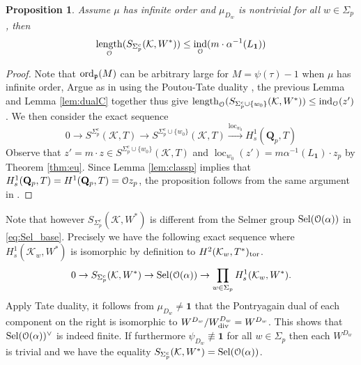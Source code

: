 \documentclass[leqno]{amsart}
\newtheorem{prop}[thm]{Proposition}
\theoremstyle{definition}
\theoremstyle{remark}
\newcommand{\id}{\mathbf{1}}
\newcommand{\eo}{\EuScript{O}}
\newcommand{\Qp}{\mathbf{Q}_p}
\DeclareMathOperator{\ind}{ind} %
\DeclareMathOperator{\length}{length}
\newcommand{\fp}{\mathfrak{p}}
\newcommand{\K}{{\mathcal{K}}} %
\newcommand{\ord}{\textnormal{ord}} %
\DeclareMathOperator{\loc}{loc}
\DeclareMathOperator{\Sel}{Sel}
\begin{document}
\begin{prop}
    Assume $\mu$ has infinite order and 
    $\mu_{D_w}$ is nontrivial for all $w\in\Sigma_p$, then
    \[
    \length_\eo(S_{\Sigma_p^c}(\K,W^*))\leq \ind_{\eo}(m\cdot \alpha^{-1}(L_\id))
    \]
\end{prop}
\begin{proof}
    Note that $\ord_\fp(M)$ can be arbitrary large for $M=\psi(\tau)-1$
    when $\mu$ has infinite order,
    Argue as in \cite[p.114]{Rubin}
    using the Poutou-Tate duality \cite[Thm 1.7.3]{Rubin},
    the previous Lemma and Lemma \ref{lem:dualC} together thus give
    $\length_\eo(S_{\Sigma_p^c\cup \{w_0\}}(\K,W^*))\leq \ind_{\eo}(z')$.
    We then consider the exact sequence
    \[
    0\to S^{\Sigma_p^c}(\K, T)\to 
    S^{\Sigma_p^c\cup\{w_0\}}(\K, T)\xrightarrow{\loc_{w_0}}  
    H^1_s(\Qp,T)
    \]
    Observe that $z'=m\cdot z\in S^{\Sigma_p^c\cup\{w_0\}}(\K,T)$
    and $\loc_{w_0}(z')=m\alpha^{-1}(L_\id)\cdot z_p$
    by Theorem \ref{thm:eu}.
    Since Lemma \ref{lem:classp} implies that
    $H^1_s(\Qp,T)=H^1(\Qp,T)=\eo z_p$,
    the proposition follows from the same argument in \cite[Thm 2.2.10]{Rubin}.
\end{proof}

Note that however $S_{\Sigma_p^c}(\K,W^*)$ is different
from the Selmer group $\Sel(\eo(\alpha))$ in \eqref{eq:Sel_base}.
Precisely we have the following exact sequence
where $H^1_s(\K_w,W^*)$ is isomorphic by definition to
$H^2(\K_w, T^*)_{\textnormal{tor}}$.
\[
    0\to S_{\Sigma_p^c}(\K,W^*)\to 
    \Sel(\eo(\alpha))\to \prod_{w\in\Sigma_p}H^1_s(\K_w,W^*).
\]
Apply Tate duality, it follows from $\mu_{D_w}\neq \id$ that
the Pontryagain dual of each component on the right is isomorphic to
$W^{D_w}/W^{D_w}_{\textnormal{div}}=W^{D_w}$.
This shows that $\Sel(\eo(\alpha))^\vee$ is indeed finite.
If furthermore $\psi_{D_w}\not\equiv\id$ for all $w\in \Sigma_p$
then each $W^{D_w}$ is trivial
and we have the equality 
$S_{\Sigma_p^c}(\K,W^*)=\Sel(\eo(\alpha))$.
\end{document}

